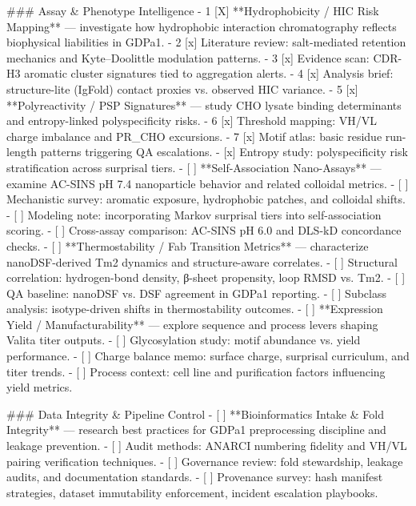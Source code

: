 ### Assay & Phenotype Intelligence
- 1 [X] **Hydrophobicity / HIC Risk Mapping** — investigate how hydrophobic interaction chromatography reflects biophysical liabilities in GDPa1.
  - 2 [x] Literature review: salt-mediated retention mechanics and Kyte–Doolittle modulation patterns.
  - 3 [x] Evidence scan: CDR-H3 aromatic cluster signatures tied to aggregation alerts.
  - 4 [x] Analysis brief: structure-lite (IgFold) contact proxies vs. observed HIC variance.
- 5 [x] **Polyreactivity / PSP Signatures** — study CHO lysate binding determinants and entropy-linked polyspecificity risks.
  - 6 [x] Threshold mapping: VH/VL charge imbalance and PR_CHO excursions.
  - 7 [x] Motif atlas: basic residue run-length patterns triggering QA escalations.
    - [x] Entropy study: polyspecificity risk stratification across surprisal tiers.
- [ ] **Self-Association Nano-Assays** — examine AC-SINS pH 7.4 nanoparticle behavior and related colloidal metrics.
  - [ ] Mechanistic survey: aromatic exposure, hydrophobic patches, and colloidal shifts.
  - [ ] Modeling note: incorporating Markov surprisal tiers into self-association scoring.
  - [ ] Cross-assay comparison: AC-SINS pH 6.0 and DLS-kD concordance checks.
- [ ] **Thermostability / Fab Transition Metrics** — characterize nanoDSF-derived Tm2 dynamics and structure-aware correlates.
  - [ ] Structural correlation: hydrogen-bond density, β-sheet propensity, loop RMSD vs. Tm2.
  - [ ] QA baseline: nanoDSF vs. DSF agreement in GDPa1 reporting.
  - [ ] Subclass analysis: isotype-driven shifts in thermostability outcomes.
- [ ] **Expression Yield / Manufacturability** — explore sequence and process levers shaping Valita titer outputs.
  - [ ] Glycosylation study: motif abundance vs. yield performance.
  - [ ] Charge balance memo: surface charge, surprisal curriculum, and titer trends.
  - [ ] Process context: cell line and purification factors influencing yield metrics.

### Data Integrity & Pipeline Control
- [ ] **Bioinformatics Intake & Fold Integrity** — research best practices for GDPa1 preprocessing discipline and leakage prevention.
  - [ ] Audit methods: ANARCI numbering fidelity and VH/VL pairing verification techniques.
  - [ ] Governance review: fold stewardship, leakage audits, and documentation standards.
  - [ ] Provenance survey: hash manifest strategies, dataset immutability enforcement, incident escalation playbooks.

